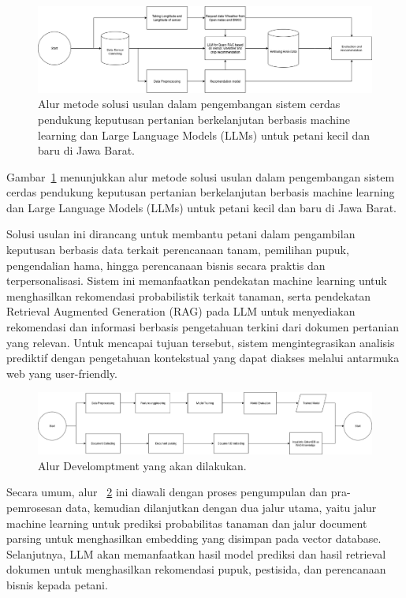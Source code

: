 \documentclass{article} %
\begin{document}
\begin{figure}[H]
    \centering
    \includegraphics[width=\textwidth]{flowchart sistem.png}
    \caption{Alur metode solusi usulan dalam pengembangan sistem cerdas pendukung keputusan pertanian berkelanjutan berbasis machine learning dan Large Language Models (LLMs) untuk petani kecil dan baru di Jawa Barat.}
    \label{fig:flowchartsistem}
\end{figure}

Gambar~\ref{fig:flowchartsistem} menunjukkan alur metode solusi usulan dalam pengembangan sistem cerdas pendukung keputusan pertanian berkelanjutan berbasis machine learning dan Large Language Models (LLMs) untuk petani kecil dan baru di Jawa Barat.

Solusi usulan ini dirancang untuk membantu petani dalam pengambilan keputusan berbasis data terkait perencanaan tanam, pemilihan pupuk, pengendalian hama, hingga perencanaan bisnis secara praktis dan terpersonalisasi. Sistem ini memanfaatkan pendekatan machine learning untuk menghasilkan rekomendasi probabilistik terkait tanaman, serta pendekatan Retrieval Augmented Generation (RAG) pada LLM untuk menyediakan rekomendasi dan informasi berbasis pengetahuan terkini dari dokumen pertanian yang relevan. Untuk mencapai tujuan tersebut, sistem mengintegrasikan analisis prediktif dengan pengetahuan kontekstual yang dapat diakses melalui antarmuka web yang user-friendly. 

\begin{figure}[H]
    \centering
    \includegraphics[width=\textwidth]{flowdiagramdev.png}
    \caption{Alur Develomptment yang akan dilakukan.}
    \label{fig:flowchartdev}
\end{figure}
Secara umum,  alur ~\ref{fig:flowchartdev} ini diawali dengan proses pengumpulan dan pra-pemrosesan data, kemudian dilanjutkan dengan dua jalur utama, yaitu jalur machine learning untuk prediksi probabilitas tanaman dan jalur document parsing untuk menghasilkan embedding yang disimpan pada vector database. Selanjutnya, LLM akan memanfaatkan hasil model prediksi dan hasil retrieval dokumen untuk menghasilkan rekomendasi pupuk, pestisida, dan perencanaan bisnis kepada petani.
\end{document}
